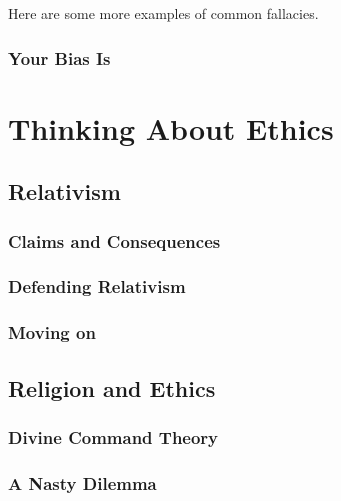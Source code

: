 \documentclass[justified]{tufte-book}
\begin{document}
Here are some more examples of common fallacies.

\hypertarget{your-bias-is}{%
\section{Your Bias Is}\label{your-bias-is}}

\hypertarget{part-thinking-about-ethics}{%
\part{Thinking About Ethics}\label{part-thinking-about-ethics}}

\hypertarget{relativism}{%
\chapter{Relativism}\label{relativism}}

\hypertarget{claims-and-consequences}{%
\section{Claims and Consequences}\label{claims-and-consequences}}

\hypertarget{defending-relativism}{%
\section{Defending Relativism}\label{defending-relativism}}

\hypertarget{moving-on}{%
\section{Moving on}\label{moving-on}}

\hypertarget{religion-and-ethics}{%
\chapter{Religion and Ethics}\label{religion-and-ethics}}

\hypertarget{divine-command-theory}{%
\section{Divine Command Theory}\label{divine-command-theory}}

\hypertarget{a-nasty-dilemma}{%
\section{A Nasty Dilemma}\label{a-nasty-dilemma}}
\end{document}

